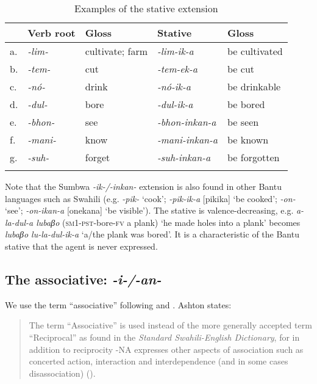 \documentclass[output=paper		  ]{langscibook}
\begin{document}
\begin{table}
\begin{tabularx}{\textwidth}{lllll}
\lsptoprule
 & Verb root & Gloss & Stative & Gloss\\
 \midrule
 {a.} & {\textit{{}-lim-}} & cultivate; farm & {\itshape {}-lim-ik-a} & {{be cultivated}}\\
 {b.} & {\textit{{}-tem-}} & cut & {\itshape {}-tem-ek-a} & be cut\\
 {c.} & {\textit{{}-nó-}} & {{drink}} & {\itshape {}-nó-ik-a} & {{be drinkable}}\\
 {d.} & {\textit{{}-dul-}} & {{bore}} & {\itshape {}-dul-ik-a} & be bored\\
 {e.} & {\textit{{}-bhon-}} & {{see}} & {\itshape {}-bhon-inkan-a} & be seen\\
 {f.} & {\textit{{}-mani-}} & {{know}} & {\itshape {}-mani-inkan-a} & be known\\
 {g.} & {\textit{{}-suh-}} & forget & {\itshape {}-suh-inkan-a} & be forgotten\\
\lspbottomrule
\end{tabularx}
\caption{Examples of the stative extension}
\label{tabex:kahigi:11}
\end{table}

{Note that the Sumbwa} {\textit{{}-ik-/-inkan-}} {extension is also found in other Bantu languages such as Swahili (e.g.} {\textit{{}-pik-}} {‘cook’;} {\textit{{}-pik-ik-a}} {[pikika] ‘be cooked’;} {\textit{{}-on-}} {‘see’;} {\textit{{}-on-ikan-a}} {[onekana] ‘be visible’). The stative is valence-decreasing, e.g.} {\textit{a-la-dul-a lubaβo} }\textsc{(sm1-pst-}bore-\textsc{fv} a plank) ‘he made holes into a plank’ becomes {\textit{lubaβo lu-la-dul-ik-a} }{‘a/the plank was bored’. It is a characteristic of the Bantu stative that the agent is never expressed.}

\subsection{The associative: \textit{{}-i-/-an-}}\label{sec:kahigi:2.7}

{We use the term ``associative'' following \citet{Ashton1947} and \citet[164]{MagangaSchadeberg1992}. Ashton states:}

\begin{quote}
{The term “Associative” is used instead of the more generally accepted term “Reciprocal” as found in the} {\textit{Standard Swahili-English Dictionary}}{, for in addition to reciprocity -NA expresses other aspects of association such as concerted action, interaction and interdependence (and in some cases disassociation) (\citeyear[240]{Ashton1947}).}
\end{quote}
\end{document}
